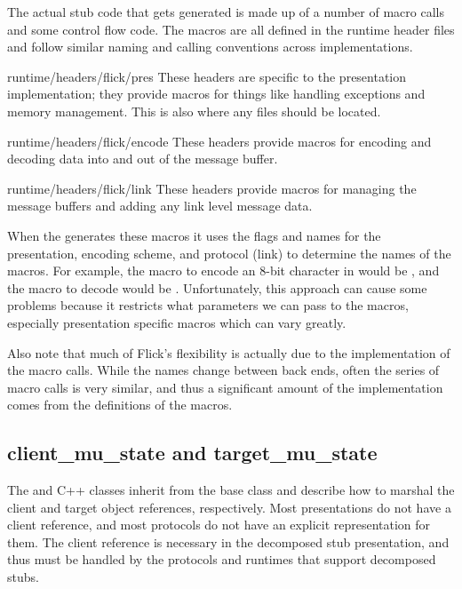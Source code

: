 The actual stub code that gets generated is made up of a number of macro calls
and some control flow code.  The macros are all defined in the runtime header
files and follow similar naming and calling conventions across implementations.

\begin{filenamelist}
  \item[runtime/headers/flick/pres] These headers are specific to the
  presentation implementation; they provide macros for things like handling
  exceptions and memory management.  This is also where any \SCML{} files
  should be located.

  \item[runtime/headers/flick/encode] These headers provide macros for encoding
  and decoding data into and out of the message buffer.

  \item[runtime/headers/flick/link] These headers provide macros for managing
  the message buffers and adding any link level message data.
\end{filenamelist}

When the  generates these macros it uses the 
flags and names for the presentation, encoding scheme, and protocol (link) to
determine the names of the macros.  For example, the macro to encode an 8-bit
character in \CDR{} would be , and the
macro to decode would be .  Unfortunately,
this approach can cause some problems because it restricts what parameters we
can pass to the macros, especially presentation specific macros which can vary
greatly.

Also note that much of Flick's flexibility is actually due to the
implementation of the macro calls.  While the names change between back ends,
often the series of macro calls is very similar, and thus a significant amount
of the implementation comes from the definitions of the macros.

\subsection{client\_mu\_state and target\_mu\_state}
\label{subsec:BE:clientmustate and targetmustate}

The  and  C++ classes inherit
from the base  class and describe how to marshal the client and
target object references, respectively.  Most presentations do not have a
client reference, and most protocols do not have an explicit representation for
them.  The client reference is necessary in the decomposed stub presentation,
and thus must be handled by the protocols and runtimes that support decomposed
stubs.


